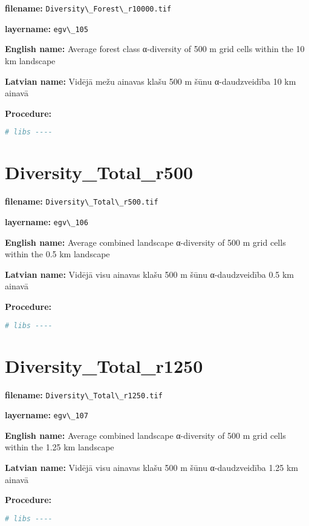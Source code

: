 \documentclass[
]{book}
\newcommand{\passthrough}[1]{#1}
\begin{document}
\textbf{filename:} \passthrough{\lstinline!Diversity\_Forest\_r10000.tif!}

\textbf{layername:} \passthrough{\lstinline!egv\_105!}

\textbf{English name:} Average forest class α-diversity of 500 m grid cells within the 10 km landscape

\textbf{Latvian name:} Vidējā mežu ainavas klašu 500 m šūnu α-daudzveidība 10 km ainavā

\textbf{Procedure:}

\begin{lstlisting}[language=R]
# libs ----
\end{lstlisting}

\section{Diversity\_Total\_r500}\label{ch06.106}

\textbf{filename:} \passthrough{\lstinline!Diversity\_Total\_r500.tif!}

\textbf{layername:} \passthrough{\lstinline!egv\_106!}

\textbf{English name:} Average combined landscape α-diversity of 500 m grid cells within the 0.5 km landscape

\textbf{Latvian name:} Vidējā visu ainavas klašu 500 m šūnu α-daudzveidība 0.5 km ainavā

\textbf{Procedure:}

\begin{lstlisting}[language=R]
# libs ----
\end{lstlisting}

\section{Diversity\_Total\_r1250}\label{ch06.107}

\textbf{filename:} \passthrough{\lstinline!Diversity\_Total\_r1250.tif!}

\textbf{layername:} \passthrough{\lstinline!egv\_107!}

\textbf{English name:} Average combined landscape α-diversity of 500 m grid cells within the 1.25 km landscape

\textbf{Latvian name:} Vidējā visu ainavas klašu 500 m šūnu α-daudzveidība 1.25 km ainavā

\textbf{Procedure:}

\begin{lstlisting}[language=R]
# libs ----
\end{lstlisting}
\end{document}

